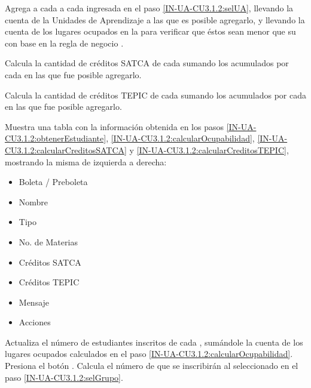 \begin{UCtrayectoria}
	\UCpaso  \label{IN-UA-CU3.1.2:calcularOcupabilidad}Agrega a cada  a cada  ingresada en el paso \ref{IN-UA-CU3.1.2:selUA}, llevando la cuenta de la Unidades de Aprendizaje a las que es posible agregarlo, y llevando la cuenta de los lugares ocupados en la  para verificar que éstos sean menor que su  con base en la regla de negocio . 
	
	\UCpaso  \label{IN-UA-CU3.1.2:calcularCreditosSATCA}Calcula la cantidad de créditos SATCA de cada  sumando los  acumulados por cada  en las que fue posible agregarlo.
	
	\UCpaso  \label{IN-UA-CU3.1.2:calcularCreditosTEPIC}Calcula la cantidad de créditos TEPIC de cada  sumando los  acumulados por cada  en las que fue posible agregarlo.
	
	\UCpaso  \label{IN-UA-CU3.1.2:tabla}Muestra una tabla con la información obtenida en los pasos \ref{IN-UA-CU3.1.2:obtenerEstudiante}, \ref{IN-UA-CU3.1.2:calcularOcupabilidad}, \ref{IN-UA-CU3.1.2:calcularCreditosSATCA} y \ref{IN-UA-CU3.1.2:calcularCreditosTEPIC}, mostrando la misma de izquierda a derecha:
	\begin{itemize}
		\item Boleta / Preboleta
		\item Nombre
		\item Tipo
		\item No. de Materias
		\item Créditos SATCA
		\item Créditos TEPIC
		\item Mensaje
		\item Acciones
	\end{itemize}
	\UCpaso Actualiza el número de estudiantes inscritos de cada , sumándole la cuenta de los lugares ocupados calculados en el paso \ref{IN-UA-CU3.1.2:calcularOcupabilidad}.
	\UCpaso[\UCactor]  \label{IN-UA-CU3.1.2:inscribir}Presiona el botón .  
	\UCpaso Calcula el número de  que se inscribirán al  seleccionado en el paso \ref{IN-UA-CU3.1.2:selGrupo}.
	

\end{UCtrayectoria}
